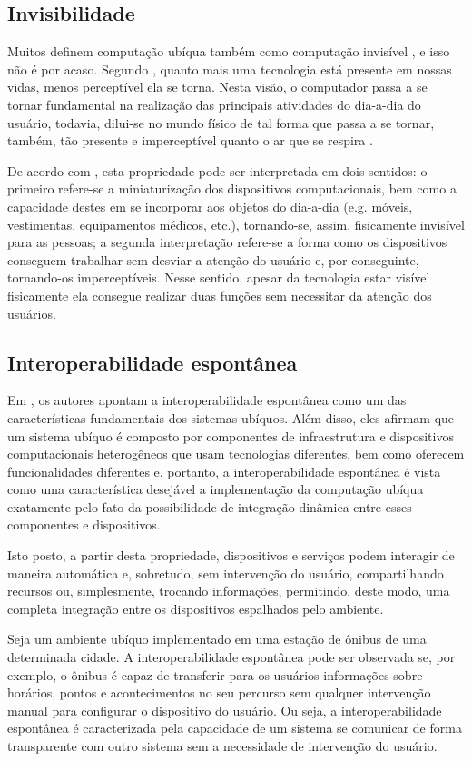 \subsection{Invisibilidade}
Muitos definem computação ubíqua também como computação invisível \citep{gomes2007}, e isso não é por acaso. Segundo \cite{weiser1991}, quanto mais uma tecnologia está presente em nossas vidas, menos perceptível ela se torna.  Nesta visão, o computador passa a se tornar fundamental na realização das principais atividades do dia-a-dia do usuário, todavia, dilui-se no mundo físico de tal forma que passa a se tornar, também, tão presente e imperceptível quanto o ar que se respira \citep{gomes2007}.

De acordo com \cite{queirozfilho2012}, esta propriedade pode ser interpretada em dois sentidos: o primeiro refere-se a miniaturização dos dispositivos computacionais, bem como a capacidade destes em se incorporar aos objetos do dia-a-dia (e.g. móveis, vestimentas, equipamentos médicos, etc.), tornando-se,  assim, fisicamente invisível para as pessoas;  a segunda interpretação refere-se a forma como os dispositivos conseguem trabalhar sem desviar a atenção do usuário e, por conseguinte,  tornando-os imperceptíveis.  Nesse sentido, apesar da tecnologia estar visível fisicamente ela consegue realizar duas funções sem necessitar da atenção dos usuários.  

\subsection{Interoperabilidade espontânea}
Em \cite{kindBerg2012}, os autores apontam a interoperabilidade espontânea como um das características fundamentais dos sistemas ubíquos. Além disso, eles afirmam que um sistema ubíquo é composto por componentes de infraestrutura e dispositivos computacionais heterogêneos que usam tecnologias diferentes, bem como oferecem funcionalidades diferentes e, portanto, a interoperabilidade espontânea é vista como uma característica desejável a implementação da computação ubíqua exatamente pelo fato da possibilidade de integração dinâmica entre esses componentes e dispositivos. 

Isto posto, a partir desta propriedade, dispositivos e serviços podem interagir de maneira automática e, sobretudo, sem intervenção do usuário, compartilhando recursos ou, simplesmente, trocando informações, permitindo, deste modo, uma completa integração entre os dispositivos espalhados pelo ambiente. 

Seja um ambiente ubíquo implementado em uma estação de ônibus de uma determinada cidade. A interoperabilidade espontânea pode ser observada se, por exemplo, o ônibus é capaz de transferir  para os usuários informações sobre horários, pontos e acontecimentos no seu percurso sem qualquer intervenção manual para configurar o dispositivo do usuário. Ou seja, a interoperabilidade espontânea  é caracterizada pela capacidade de um sistema se comunicar de forma transparente com outro sistema sem a necessidade de intervenção do usuário.


